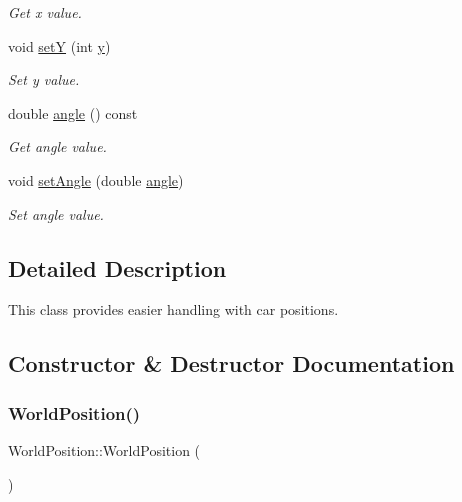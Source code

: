 \begin{DoxyCompactItemize}
\begin{DoxyCompactList}\small\item\em Get x value. \end{DoxyCompactList}\item 
void \mbox{\hyperlink{class_world_position_abfae710277c596fc57fdd9fefaac1190}{setY}} (int \mbox{\hyperlink{class_world_position_a27974b894b7f7ccc25ed8c27b05c79ac}{y}})
\begin{DoxyCompactList}\small\item\em Set y value. \end{DoxyCompactList}\item 
double \mbox{\hyperlink{class_world_position_af69b8ff7bd453f0e39a6a2deec64ef42}{angle}} () const
\begin{DoxyCompactList}\small\item\em Get angle value. \end{DoxyCompactList}\item 
void \mbox{\hyperlink{class_world_position_a04fb55b48cf6f02437fe7d70630e464e}{set\+Angle}} (double \mbox{\hyperlink{class_world_position_af69b8ff7bd453f0e39a6a2deec64ef42}{angle}})
\begin{DoxyCompactList}\small\item\em Set angle value. \end{DoxyCompactList}\end{DoxyCompactItemize}


\subsection{Detailed Description}
This class provides easier handling with car positions. 

\subsection{Constructor \& Destructor Documentation}
\mbox{\label{class_world_position_ac85db09f51083bbf79de9eeec77fed4a}} 
\subsubsection{\texorpdfstring{WorldPosition()}{WorldPosition()}\hspace{0.1cm}{\footnotesize\ttfamily [1/2]}}
{\footnotesize\ttfamily World\+Position\+::\+World\+Position (\begin{DoxyParamCaption}{ }\end{DoxyParamCaption})}



